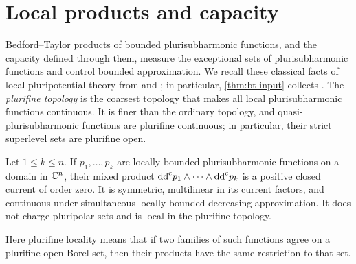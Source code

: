 \section{Local products and capacity}
\label{sec:psh-local-capacity}

Bedford--Taylor products of bounded plurisubharmonic functions, and the capacity defined through them, measure the exceptional sets of plurisubharmonic functions and control bounded approximation. We recall these classical facts of local pluripotential theory from \cite[Chapters~3 and~4]{GZ17} and \cite[Sections~1.3, 2.1 and~2.3]{SGPT}; in particular, \cref{thm:bt-input} collects \cite[Proposition~2.1.1, Theorem~2.1.1 and Proposition~2.2.1]{SGPT}. The \emph{plurifine topology} is the coarsest topology that makes all local plurisubharmonic functions continuous. It is finer than the ordinary topology, and quasi-plurisubharmonic functions are plurifine continuous; in particular, their strict superlevel sets are plurifine open.

\begin{theorem}
\label{thm:bt-input}
Let $1\leq k\leq n$. If $p_1,\ldots,p_k$ are locally bounded plurisubharmonic functions on a domain in $\mathbb C^n$, their mixed product
$\mathrm{dd}^{\mathrm{c}} p_1\wedge\cdots\wedge\mathrm{dd}^{\mathrm{c}} p_k$ is a positive closed current of order zero. It is symmetric, multilinear in its current factors, and continuous under simultaneous locally bounded decreasing approximation. It does not charge pluripolar sets and is local in the plurifine topology.
\end{theorem}

Here plurifine locality means that if two families of such functions agree on a plurifine open Borel set, then their products have the same restriction to that set.



